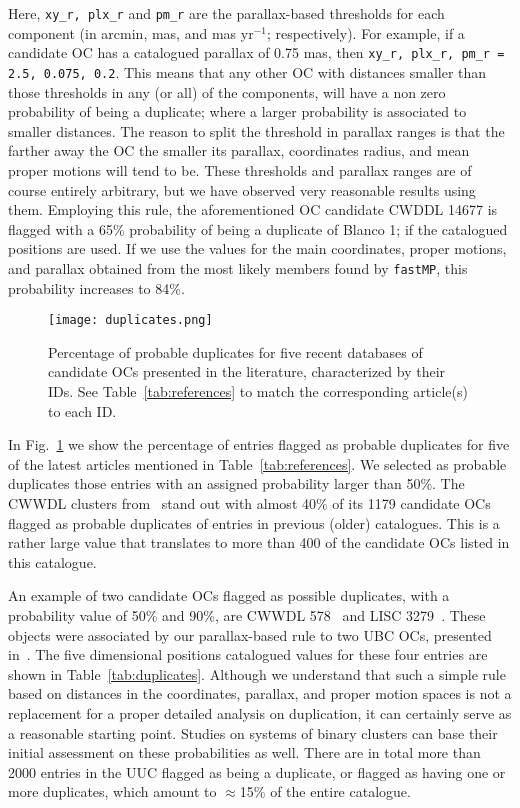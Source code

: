\documentclass[fleqn,usenatbib]{mnras}
\begin{document}
Here, \texttt{xy\_r, plx\_r} and \texttt{pm\_r} are the parallax-based
thresholds for each component (in arcmin, mas, and mas yr$^{-1}$; respectively).
For example, if a candidate OC has a catalogued parallax of 0.75 mas, then 
\texttt{xy\_r, plx\_r, pm\_r = 2.5, 0.075, 0.2}. This
means that any other OC with distances smaller than those thresholds in any (or
all) of the components, will have a non zero probability of being a duplicate;
where a larger probability is associated to smaller distances.
The reason to split the threshold in parallax ranges is that the farther away
the OC the smaller its parallax, coordinates radius, and mean proper motions
will tend to be. These thresholds and parallax ranges are of course entirely
arbitrary, but we have observed very reasonable results using them.
%
Employing this rule, the aforementioned OC candidate CWDDL 14677 is flagged with
a 65\% probability of being a duplicate of Blanco 1; if the catalogued positions
are used. If we use the values for the main coordinates, proper motions, and
parallax obtained from the most likely members found by \texttt{fastMP}, this
probability increases to 84\%.\\

\begin{figure}
	\texttt{[image: duplicates.png]}
    \caption{Percentage of probable duplicates for five recent databases of
    candidate OCs presented in the literature, characterized by their IDs.
    See Table~\ref{tab:references} to match the corresponding article(s)
    to each ID.}
    \label{fig:duplicates}
\end{figure}

In Fig.~\ref{fig:duplicates} we show the percentage of entries flagged as
probable duplicates for five of the latest articles mentioned in
Table~\ref{tab:references}. We selected as probable duplicates those entries
with an assigned probability larger than 50\%.
The CWWDL clusters from~\cite{Chi_2023_3} stand out with almost 40\% of its
1179 candidate OCs flagged as probable duplicates of entries in previous (older)
catalogues. This is a rather large value that translates to more than 400 of the
candidate OCs listed in this catalogue.

An example of two candidate OCs flagged as possible duplicates, with a
probability value of 50\% and 90\%, are CWWDL 578~\cite{Chi_2023_3} and
LISC 3279~\citep{Li_2022}. These objects
were associated by our parallax-based rule to two UBC OCs, presented
in~\cite{Castro-Ginard_2020}.
The five dimensional positions catalogued values for these four entries
are shown in Table~\ref{tab:duplicates}.
Although we understand that such a simple rule based on distances in the
coordinates, parallax, and proper motion spaces is not a replacement for a
proper detailed analysis on duplication, it can certainly serve as a reasonable
starting point. Studies on systems of binary clusters can base their initial
assessment on these probabilities as well. There are in total more than 2000
entries in the UUC flagged as being a duplicate, or flagged as having one or
more duplicates, which amount to $\approx$15\% of the entire catalogue.
\end{document}
